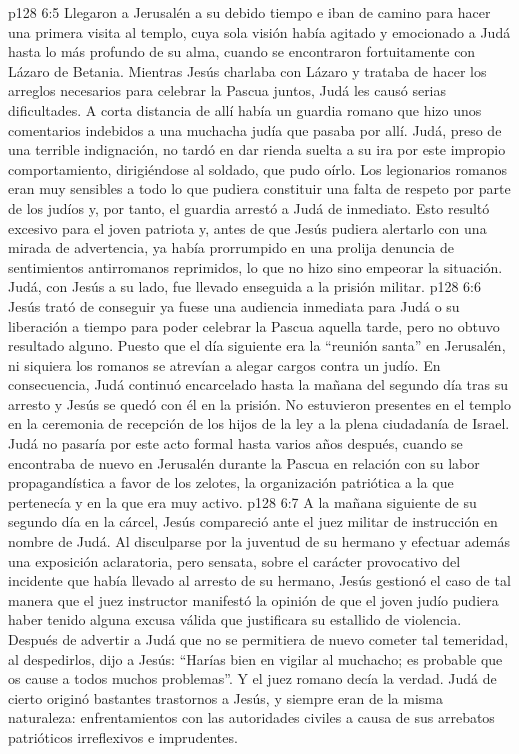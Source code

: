 \vs p128 6:5 Llegaron a Jerusalén a su debido tiempo e iban de camino para hacer una primera visita al templo, cuya sola visión había agitado y emocionado a Judá hasta lo más profundo de su alma, cuando se encontraron fortuitamente con Lázaro de Betania. Mientras Jesús charlaba con Lázaro y trataba de hacer los arreglos necesarios para celebrar la Pascua juntos, Judá les causó serias dificultades. A corta distancia de allí había un guardia romano que hizo unos comentarios indebidos a una muchacha judía que pasaba por allí. Judá, preso de una terrible indignación, no tardó en dar rienda suelta a su ira por este impropio comportamiento, dirigiéndose al soldado, que pudo oírlo. Los legionarios romanos eran muy sensibles a todo lo que pudiera constituir una falta de respeto por parte de los judíos y, por tanto, el guardia arrestó a Judá de inmediato. Esto resultó excesivo para el joven patriota y, antes de que Jesús pudiera alertarlo con una mirada de advertencia, ya había prorrumpido en una prolija denuncia de sentimientos antirromanos reprimidos, lo que no hizo sino empeorar la situación. Judá, con Jesús a su lado, fue llevado enseguida a la prisión militar.
\vs p128 6:6 Jesús trató de conseguir ya fuese una audiencia inmediata para Judá o su liberación a tiempo para poder celebrar la Pascua aquella tarde, pero no obtuvo resultado alguno. Puesto que el día siguiente era la “reunión santa” en Jerusalén, ni siquiera los romanos se atrevían a alegar cargos contra un judío. En consecuencia, Judá continuó encarcelado hasta la mañana del segundo día tras su arresto y Jesús se quedó con él en la prisión. No estuvieron presentes en el templo en la ceremonia de recepción de los hijos de la ley a la plena ciudadanía de Israel. Judá no pasaría por este acto formal hasta varios años después, cuando se encontraba de nuevo en Jerusalén durante la Pascua en relación con su labor propagandística a favor de los zelotes, la organización patriótica a la que pertenecía y en la que era muy activo.
\vs p128 6:7 A la mañana siguiente de su segundo día en la cárcel, Jesús compareció ante el juez militar de instrucción en nombre de Judá. Al disculparse por la juventud de su hermano y efectuar además una exposición aclaratoria, pero sensata, sobre el carácter provocativo del incidente que había llevado al arresto de su hermano, Jesús gestionó el caso de tal manera que el juez instructor manifestó la opinión de que el joven judío pudiera haber tenido alguna excusa válida que justificara su estallido de violencia. Después de advertir a Judá que no se permitiera de nuevo cometer tal temeridad, al despedirlos, dijo a Jesús: “Harías bien en vigilar al muchacho; es probable que os cause a todos muchos problemas”. Y el juez romano decía la verdad. Judá de cierto originó bastantes trastornos a Jesús, y siempre eran de la misma naturaleza: enfrentamientos con las autoridades civiles a causa de sus arrebatos patrióticos irreflexivos e imprudentes.
